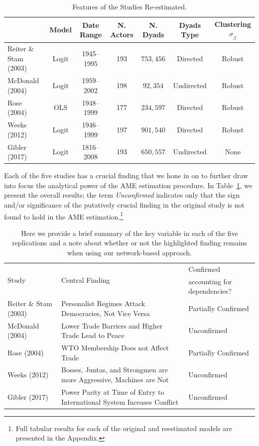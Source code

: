 \begin{table}
\caption{Features of the Studies Re-estimated.}
	\begin{tabular}{lcccccc}
		& Model &  Date Range & N. Actors  & N. Dyads & Dyads Type & Clustering $\sigma_{\hat{\beta}}$ \\ \toprule
		Reiter \& Stam (2003) &Logit &1945--1995 &  193 & $753,456$ & Directed & Robust \\	
		McDonald (2004) & Logit &1959--2002 & 198 & $92,354$ & Undirected & Robust\\
		Rose (2004) & OLS & 1948--1999 & 177 & $234,597$ & Directed & Robust \\	 
		Weeks (2012) & Logit & 1946--1999 &197 &  $901,540$ & Directed & Robust \\
		Gibler (2017) & Logit & 1816--2008 &193 &   $650,557$ & Undirected & None \\ \bottomrule
	\end{tabular}
\end{table}

Each of the five studies has a crucial finding that we hone in on to further draw into focus the analytical power of the AME estimation procedure.  In Table~\ref{tab:modelFindingSumm}, we present the overall results; the term \textit{Unconfirmed} indicates only that the sign and/or significance of the putatively crucial finding in the original study is not found to hold in the AME estimation.\footnote{Full tabular results for each of the original and reestimated models are presented in the Appendix.}

\begin{table}[ht]
\centering
\caption{Here we provide a brief summary of the key variable in each of the five replications and a note about whether or not the highlighted finding remains when using our network-based approach.}
	\begin{tabular}{l p{7cm} l} \toprule
		\multirow{2}{*}{Study} & \multirow{2}{*}{Central Finding} &  Confirmed \\
		& &  accounting for dependencies? \\ \toprule
		Reiter \& Stam (2003) & Personalist Regimes Attack Democracies, Not Vice Versa & {Partially Confirmed} \\ \midrule
		McDonald (2004) & Lower Trade Barriers and Higher Trade Lead to Peace & {Unconfirmed}\\ \midrule
		Rose (2004) & WTO Membership Does not Affect Trade & {Partially Confirmed}\\ \midrule
		Weeks (2012) & Bosses, Juntas, and Strongmen are more Aggressive, Machines are Not & {Unconfirmed} \\\midrule
		Gibler (2017) & Power Parity at Time of Entry to International System Inceases Conflict & {Unconfirmed}\\ \bottomrule
	\end{tabular}
	\label{tab:modelFindingSumm}
\end{table}

